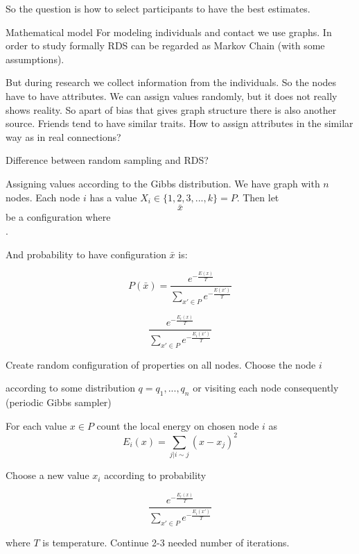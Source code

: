 \documentclass[12pt]{report}
\begin{document}
So the question is how to select participants to have the best estimates. 

Mathematical model
For modeling individuals and contact we use graphs.
In order to study formally RDS can be regarded as Markov Chain (with some assumptions). 

But during research we collect information from the individuals. So the nodes have to have attributes. We can assign values randomly, but it does not really shows reality.
So apart of bias that gives graph structure there is also another source. Friends tend to have similar traits.
How to assign attributes in the similar way as in real connections?

Difference between random sampling and RDS?

Assigning values according to the Gibbs distribution. 
We have graph with $n$ nodes. Each node $i$ has a value $X_i \in \lbrace 1, 2, 3, ..., k \rbrace = P$. Then let $$ \bar{x} $$ be a configuration where $$ $$.

And probability to have configuration $\bar{x}$ is:

$$P(\bar{x}) = \frac{ e^{-\frac{E(x)}{T}} }{ \sum\limits_{x'\in P} e^{-\frac{E(x')}{T}}}$$

$$ \frac{ e^{-\frac{E_i(x)}{T}} }{ \sum\limits_{x'\in P} e^{-\frac{E_i(x')}{T}}} $$


  Create random configuration of properties on all nodes.
 Choose the node $i$
  
 	 
		 according to some distribution $q = q_1, ..., q_n$ or
		 visiting each node consequently (periodic Gibbs sampler)
 	
  
  For each value $x \in P$ count the local energy on chosen node $i$ as 
  $$ E_i(x) = \sum\limits_{j | i \sim j}  (x - x_j)^2 $$  
  
  Choose a new value $x_i$ according to probability
  
  $$ \frac{ e^{-\frac{E_i(x)}{T}} }{ \sum\limits_{x'\in P} e^{-\frac{E_i(x')}{T}}} $$
  
	where $T$ is temperature.
 Continue 2-3 needed number of iterations.





\end{document}
